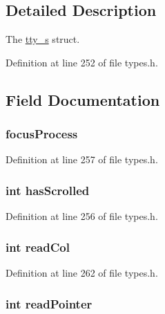 \subsection{Detailed Description}
The \hyperlink{structtty__s}{tty\_\-s} struct. 

Definition at line 252 of file types.h.



\subsection{Field Documentation}
\hypertarget{structtty__s_afefb5a7d2161ce434bcc2bbb358d5b0b}{
\subsubsection[{focusProcess}]{ {\bf focusProcess}}}
\label{structtty__s_afefb5a7d2161ce434bcc2bbb358d5b0b}


Definition at line 257 of file types.h.

\hypertarget{structtty__s_a5be2ba5c5e17899443300974060fe13f}{
\subsubsection[{hasScrolled}]{\setlength{\rightskip}{0pt plus 5cm}int {\bf hasScrolled}}}
\label{structtty__s_a5be2ba5c5e17899443300974060fe13f}


Definition at line 256 of file types.h.

\hypertarget{structtty__s_a38beda239dc9e9eb6f58cc2e818fbaa6}{
\subsubsection[{readCol}]{\setlength{\rightskip}{0pt plus 5cm}int {\bf readCol}}}
\label{structtty__s_a38beda239dc9e9eb6f58cc2e818fbaa6}


Definition at line 262 of file types.h.

\hypertarget{structtty__s_aa0a6145a711115035caf96d6d1c7d9fb}{
\subsubsection[{readPointer}]{\setlength{\rightskip}{0pt plus 5cm}int {\bf readPointer}}}
\label{structtty__s_aa0a6145a711115035caf96d6d1c7d9fb}


